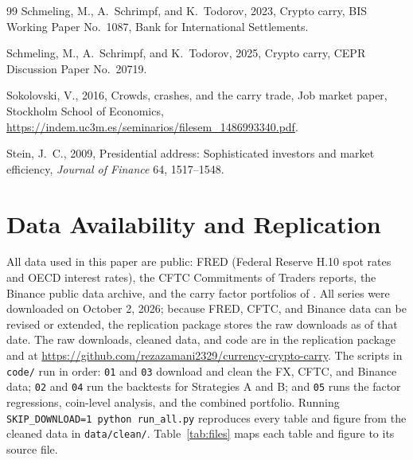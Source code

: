 \documentclass[11pt]{article}
\begin{document}
\begin{thebibliography}{99}
Schmeling, M., A.~Schrimpf, and K.~Todorov, 2023, Crypto carry, BIS Working Paper No.~1087, Bank for International Settlements.

Schmeling, M., A.~Schrimpf, and K.~Todorov, 2025, Crypto carry, CEPR Discussion Paper No.~20719.

Sokolovski, V., 2016, Crowds, crashes, and the carry trade, Job market paper, Stockholm School of Economics, \url{https://indem.uc3m.es/seminarios/filesem_1486993340.pdf}.

Stein, J.~C., 2009, Presidential address: Sophisticated investors and market efficiency, \textit{Journal of Finance} 64, 1517--1548.
\end{thebibliography}

\clearpage
{}
\appendix
\section{Data Availability and Replication}\label{app:rep}

All data used in this paper are public: FRED (Federal Reserve H.10 spot rates and OECD interest rates), the CFTC Commitments of Traders reports, the Binance public data archive, and the carry factor portfolios of \citet{LRVdata}. All series were downloaded on October 2, 2026; because FRED, CFTC, and Binance data can be revised or extended, the replication package stores the raw downloads as of that date. The raw downloads, cleaned data, and code are in the replication package and at \url{https://github.com/rezazamani2329/currency-crypto-carry}. The scripts in \texttt{code/} run in order: \texttt{01} and \texttt{03} download and clean the FX, CFTC, and Binance data; \texttt{02} and \texttt{04} run the backtests for Strategies A and B; and \texttt{05} runs the factor regressions, coin-level analysis, and the combined portfolio. Running \texttt{SKIP\_DOWNLOAD=1 python run\_all.py} reproduces every table and figure from the cleaned data in \texttt{data/clean/}. Table~\ref{tab:files} maps each table and figure to its source file.
\end{document}
